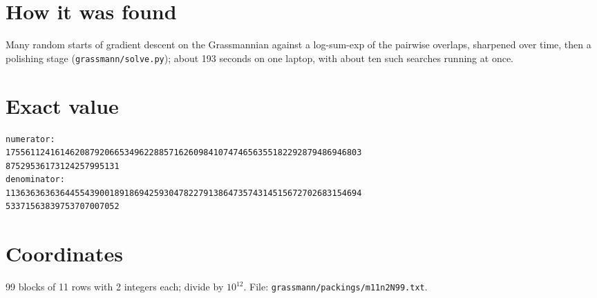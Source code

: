 \documentclass[11pt,a4paper]{article}
\begin{document}
\section{How it was found}
Many random starts of gradient descent on the Grassmannian against a log-sum-exp of the pairwise overlaps, sharpened over time, then a polishing stage (\texttt{grassmann/solve.py}); about 193 seconds on one laptop, with about ten such searches running at once.


\appendix
\section{Exact value}
{\small
\begin{verbatim}
numerator:
175561124161462087920665349622885716260984107474656355182292879486946803
87529536173124257995131
denominator:
113636363636445543900189186942593047822791386473574314515672702683154694
53371563839753707007052
\end{verbatim}}

\section{Coordinates}
99 blocks of 11 rows with 2 integers each; divide by $10^{12}$. File: \texttt{grassmann/packings/m11n2N99.txt}.
{\tiny
\begin{multicols}{4}
\end{multicols}}
\end{document}
